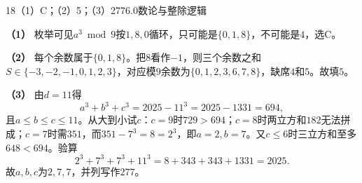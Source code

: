 \begin{solution}{18}{（1）C；（2）5；（3）277}{6.0}{数论与整除逻辑}

\textbf{（1）}
枚举可见\(a^3\bmod 9\)按\(1,8,0\)循环，只可能是\(\{0,1,8\}\)，不可能是\(4\)，选C。

\textbf{（2）}
每个余数属于\(\{0,1,8\}\)。把\(8\)看作\(-1\)，则三个余数之和\(S\in\{-3,-2,-1,0,1,2,3\}\)，对应模\(9\)余数为\(\{0,1,2,3,6,7,8\}\)，缺席\(4\)和\(5\)。故填\(5\)。

\textbf{（3）}
由\(d=11\)得
\[
a^3+b^3+c^3=2025-11^3=2025-1331=694,
\]
且\(a\le b\le c\le11\)。从大到小试\(c\)：\(c=9\)时\(729>694\)；\(c=8\)时两立方和\(182\)无法拼成；\(c=7\)时需\(351\)，而\(351-7^3=8=2^3\)，即\(a=2,b=7\)。又\(c\le6\)时三立方和至多\(648<694\)。验算
\[
2^3+7^3+7^3+11^3=8+343+343+1331=2025.
\]
故\(a,b,c\)为\(2,7,7\)，并列写作\(277\)。

\end{solution}
